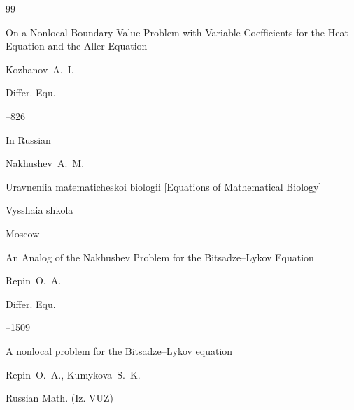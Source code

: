\begin{thebibliography}{99}

\paper On a Nonlocal Boundary Value Problem with Variable Coefficients for the Heat Equation and the Aller Equation

\by  Kozhanov~A.~I.


\jour Differ. Equ.




--826





\lang In Russian

\by Nakhushev~A.~M.

\book Uravneniia matematicheskoi biologii \rm [Equations of Mathematical Biology]


\publ Vysshaia shkola

\publaddr Moscow







\paper An Analog of the Nakhushev Problem for the Bitsadze–Lykov Equation

\by Repin~O.~A.

\jour Differ. Equ.




--1509












\paper A nonlocal problem for the Bitsadze--Lykov equation

\by Repin~O.~A.,  Kumykova~S.~K.

\jour Russian Math. (Iz. VUZ)



\end{thebibliography}
